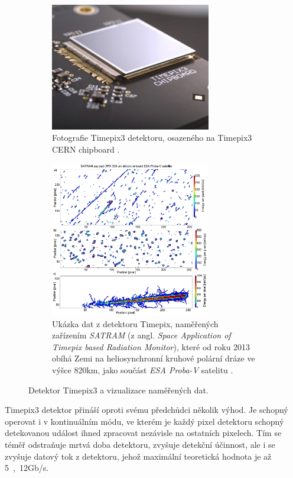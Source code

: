 \begin{figure}[bh]
    \begin{center}
        \begin{subfigure}{7.0cm}
            \includegraphics[width=7cm]{figures/timepix3.jpg}    
            \caption{Fotografie Timepix3 detektoru, osazeného na Timepix3 CERN chipboard \cite{medipix_from_medical_img_to_space}.}
        \end{subfigure}
        \hspace{0.1cm}
        \begin{subfigure}{7.0cm}
            \includegraphics[width=7cm]{figures/timepix_data_satram.png}    
            \caption{Ukázka dat z detektoru Timepix, naměřených zařízením \textit{SATRAM} (z angl. \textit{Space Application of Timepix based Radiation Monitor}), které od roku 2013 obíhá Zemi na heliosynchronní kruhové polární dráze ve výšce \unit{820}{km}, jako součást \textit{ESA Proba-V} satelitu \cite{PlatkevicDisertace}.}
        \end{subfigure}
	\end{center}
    \caption{Detektor Timepix3 a vizualizace naměřených dat.}
	\label{fig:master:frontend:detector_detail}
\end{figure}

Timepix3 detektor přináší oproti svému předchůdci několik výhod. Je schopný operovat i v kontinuálním módu, ve kterém je každý pixel detektoru schopný detekovanou událost ihned zpracovat nezávisle na ostatních pixelech. Tím se téměř odstraňuje mrtvá doba detektoru, zvyšuje detekční účinnost, ale i se zvyšuje datový tok z detektoru, jehož maximální teoretická hodnota je až \unit{5,12}{Gb/s}.


